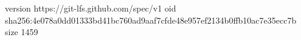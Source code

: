 version https://git-lfs.github.com/spec/v1
oid sha256:4e078a0dd01333bd41bc760ad9aaf7cfde48e957ef2134b0ffb10ac7e35ecc7b
size 1459
